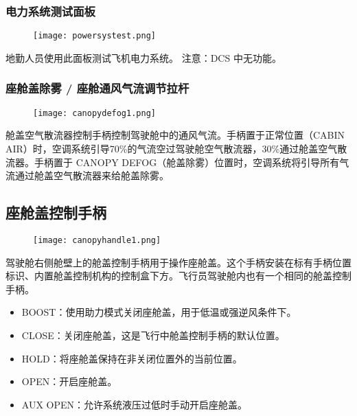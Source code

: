 \subsubsection{电力系统测试面板}
\begin{figure}[htb]
  \center
  \texttt{[image: powersystest.png]}
\end{figure}
地勤人员使用此面板测试飞机电力系统。
注意：DCS 中无功能。

\subsubsection{座舱盖除雾 / 座舱通风气流调节拉杆}
\begin{figure}[htb]
  \center
  \texttt{[image: canopydefog1.png]}
\end{figure}
舱盖空气散流器控制手柄控制驾驶舱中的通风气流。手柄置于正常位置（CABIN AIR）时，空调系统引导70\%的气流空过驾驶舱空气散流器，30\%通过舱盖空气散流器。手柄置于 CANOPY DEFOG（舱盖除雾）位置时，空调系统将引导所有气流通过舱盖空气散流器来给舱盖除雾。

\subsection{座舱盖控制手柄}
\begin{figure}[htb]
  \center
  \texttt{[image: canopyhandle1.png]}
\end{figure}
驾驶舱右侧舱壁上的舱盖控制手柄用于操作座舱盖。这个手柄安装在标有手柄位置标识、内置舱盖控制机构的控制盒下方。飞行员驾驶舱内也有一个相同的舱盖控制手柄。

\begin{itemize}
  \item BOOST：使用助力模式关闭座舱盖，用于低温或强逆风条件下。
  \item CLOSE：关闭座舱盖，这是飞行中舱盖控制手柄的默认位置。
  \item HOLD：将座舱盖保持在非关闭位置外的当前位置。
  \item OPEN：开启座舱盖。
  \item AUX OPEN：允许系统液压过低时手动开启座舱盖。
\end{itemize}
